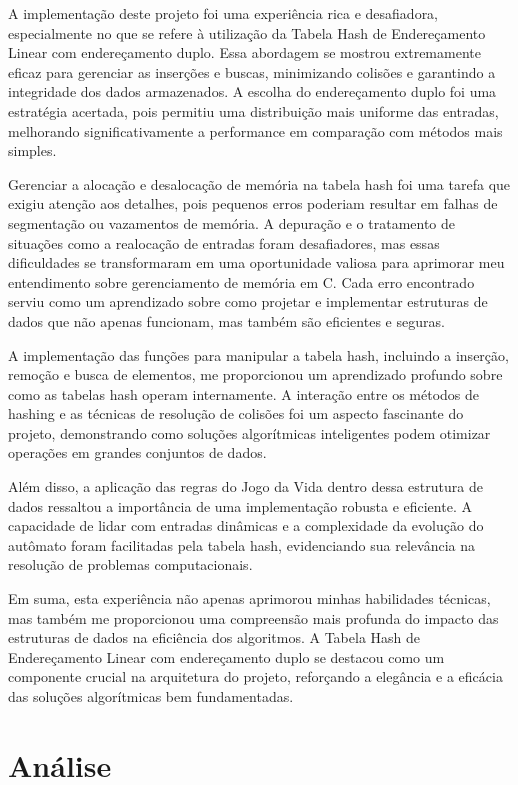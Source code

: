 \documentclass{article}
\begin{document}
\par   A implementação deste projeto foi uma experiência rica e desafiadora, especialmente no que se refere à utilização da Tabela Hash de Endereçamento Linear com endereçamento duplo. Essa abordagem se mostrou extremamente eficaz para gerenciar as inserções e buscas, minimizando colisões e garantindo a integridade dos dados armazenados. A escolha do endereçamento duplo foi uma estratégia acertada, pois permitiu uma distribuição mais uniforme das entradas, melhorando significativamente a performance em comparação com métodos mais simples.
\par Gerenciar a alocação e desalocação de memória na tabela hash foi uma tarefa que exigiu atenção aos detalhes, pois pequenos erros poderiam resultar em falhas de segmentação ou vazamentos de memória. A depuração e o tratamento de situações como a realocação de entradas foram desafiadores, mas essas dificuldades se transformaram em uma oportunidade valiosa para aprimorar meu entendimento sobre gerenciamento de memória em C. Cada erro encontrado serviu como um aprendizado sobre como projetar e implementar estruturas de dados que não apenas funcionam, mas também são eficientes e seguras.
\par A implementação das funções para manipular a tabela hash, incluindo a inserção, remoção e busca de elementos, me proporcionou um aprendizado profundo sobre como as tabelas hash operam internamente. A interação entre os métodos de hashing e as técnicas de resolução de colisões foi um aspecto fascinante do projeto, demonstrando como soluções algorítmicas inteligentes podem otimizar operações em grandes conjuntos de dados.
\par Além disso, a aplicação das regras do Jogo da Vida dentro dessa estrutura de dados ressaltou a importância de uma implementação robusta e eficiente. A capacidade de lidar com entradas dinâmicas e a complexidade da evolução do autômato foram facilitadas pela tabela hash, evidenciando sua relevância na resolução de problemas computacionais.
\par Em suma, esta experiência não apenas aprimorou minhas habilidades técnicas, mas também me proporcionou uma compreensão mais profunda do impacto das estruturas de dados na eficiência dos algoritmos. A Tabela Hash de Endereçamento Linear com endereçamento duplo se destacou como um componente crucial na arquitetura do projeto, reforçando a elegância e a eficácia das soluções algorítmicas bem fundamentadas.

\section{Análise}
\end{document}
